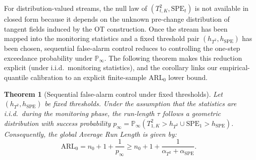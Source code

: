 \documentclass{article}
\theoremstyle{plain}
\newtheorem{theorem}{Theorem}[section]
\theoremstyle{definition}
\theoremstyle{remark}
\begin{document}


For distribution-valued streams, the null law of $(T_{t,K}^2,\mathrm{SPE}_t)$ is not available in closed form because it depends on the unknown pre-change distribution of tangent fields induced by the OT construction.
Once the stream has been mapped into the monitoring statistics and a fixed threshold pair $(h_{T^2},h_{\mathrm{SPE}})$ has been chosen, sequential false-alarm control reduces to controlling the one-step exceedance probability under $\mathbb P_{\infty}$.
The following theorem makes this reduction explicit (under i.i.d.\ monitoring statistics), and the corollary links our empirical-quantile calibration to an explicit finite-sample $\mathrm{ARL}_0$ lower bound.

\begin{theorem}[Sequential false-alarm control under fixed thresholds]\label{thm:arl_control}
Let $(h_{T^2}, h_{\mathrm{SPE}})$ be fixed thresholds. Under the assumption that the statistics are i.i.d.\ during the monitoring phase, the run-length $\tau$ follows a geometric distribution with success probability $p_{\infty} = \mathbb P_{\infty}(T_{1,K}^2>h_{T^2} \cup \mathrm{SPE}_1>h_{\mathrm{SPE}})$. 
Consequently, the global Average Run Length is given by:
\begin{equation}\mathrm{ARL}_0 = n_0+1 + \frac{1}{p_{\infty}} \ge n_0+1 + \frac{1}{\alpha_{T^2} + \alpha_{\mathrm{SPE}}}.
\end{equation}\end{theorem}

\end{document}
